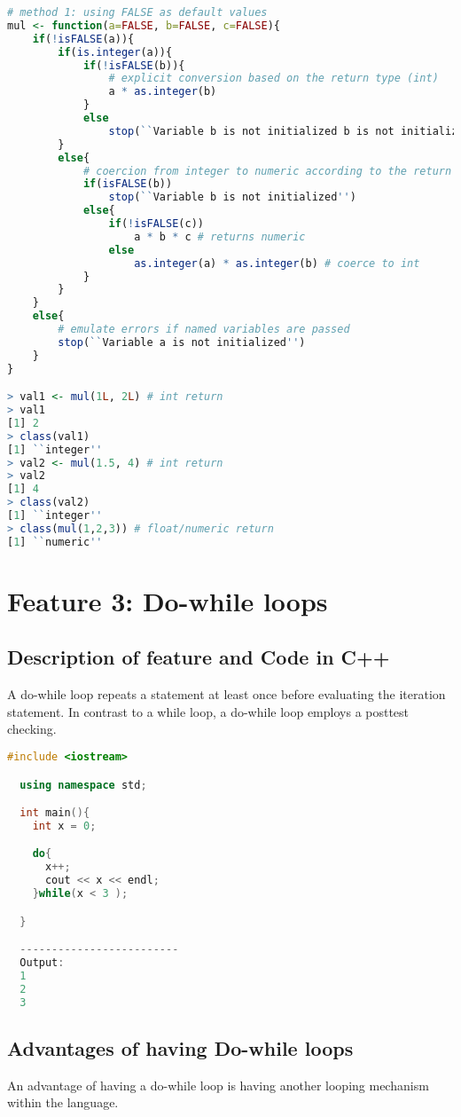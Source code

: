 \documentclass[12pt]{article}
\begin{document}
\begin{lstlisting}[language=R]
# method 1: using FALSE as default values
mul <- function(a=FALSE, b=FALSE, c=FALSE){
    if(!isFALSE(a)){
        if(is.integer(a)){
            if(!isFALSE(b)){
                # explicit conversion based on the return type (int)
                a * as.integer(b)
            }
            else
                stop(``Variable b is not initialized b is not initialized'')
        }
        else{
            # coercion from integer to numeric according to the return type (float)
            if(isFALSE(b))
                stop(``Variable b is not initialized'')
            else{
                if(!isFALSE(c))
                    a * b * c # returns numeric
                else
                    as.integer(a) * as.integer(b) # coerce to int
            }
        }
    }
    else{
        # emulate errors if named variables are passed
        stop(``Variable a is not initialized'')
    }
}

> val1 <- mul(1L, 2L) # int return
> val1
[1] 2
> class(val1)
[1] ``integer''
> val2 <- mul(1.5, 4) # int return
> val2
[1] 4
> class(val2)
[1] ``integer''
> class(mul(1,2,3)) # float/numeric return
[1] ``numeric''
\end{lstlisting}
  
\section{Feature 3: Do-while loops}

\subsection{Description of feature and Code in C++}
A do-while loop repeats a statement at least once before evaluating the iteration statement. In contrast to a while loop, a do-while loop employs a posttest checking.

\begin{lstlisting}[language=C++]
  #include <iostream>

  using namespace std;

  int main(){
    int x = 0;

    do{
      x++;
      cout << x << endl;
    }while(x < 3 );

  }

  -------------------------
  Output:
  1
  2
  3

\end{lstlisting}

\subsection{Advantages of having Do-while loops}
An advantage of having a do-while loop is having another looping mechanism within the language.
\end{document}
